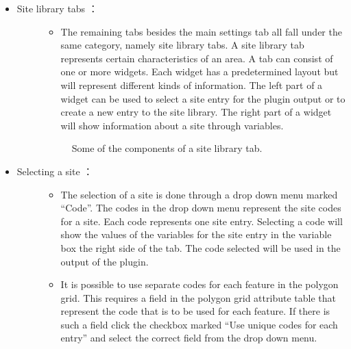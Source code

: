 \documentclass[letterpaper,10pt,english]{sphinxmanual}
\begin{document}
\begin{itemize}
\begin{description}
\begin{itemize}
\begin{description}
\begin{itemize}
\begin{description}
\end{description}

\item {} \begin{description}
\item[{Site library tabs ：}] \leavevmode\begin{itemize}
\item {} 
The remaining tabs besides the main settings tab all fall under the same category, namely site library tabs. A site library tab represents certain characteristics of an area. A tab can consist of one or more widgets. Each widget has a predetermined layout but will represent different kinds of information. The left part of a widget can be used to select a site entry for the plugin output or to create a new entry to the site library. The right part of a widget will show information about a site through variables.

\end{itemize}

\begin{figure}[htbp]
\centering
\capstart

\noindent{}
\caption{Some of the components of a site library tab.}\label{\detokenize{pre-processor/SUEWS Prepare:id11}}\end{figure}

\end{description}

\item {} \begin{description}
\item[{Selecting a site ：}] \leavevmode\begin{itemize}
\item {} 
The selection of a site is done through a drop down menu marked “Code”. The codes in the drop down menu represent the site codes for a site. Each code represents one site entry. Selecting a code will show the values of the variables for the site entry in the variable box the right side of the tab. The code selected will be used in the output of the plugin.

\item {} 
It is possible to use separate codes for each feature in the polygon grid. This requires a field in the polygon grid attribute table that represent the code that is to be used for each feature. If there is such a field click the checkbox marked “Use unique codes for each entry” and select the correct field from the drop down menu.


\end{itemize}
\end{description}
\end{itemize}
\end{description}
\end{itemize}
\end{description}
\end{itemize}
\end{document}
